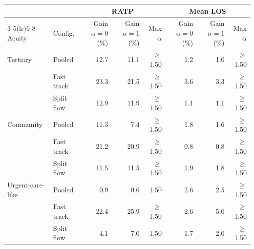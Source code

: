 \begin{tabular}{llrrrrrr}
\toprule
 & & \multicolumn{3}{c}{RATP} & \multicolumn{3}{c}{Mean LOS} \\
\cmidrule(lr){3-5}\cmidrule(lr){6-8}
Acuity & Config. & Gain $\alpha{=}0$ (\%) & Gain $\alpha{=}1$ (\%) & Max $\alpha$ & Gain $\alpha{=}0$ (\%) & Gain $\alpha{=}1$ (\%) & Max $\alpha$ \\
\midrule
Tertiary & Pooled & 12.7 & 11.1 & $\geq$1.50 & 1.2 & 1.0 & $\geq$1.50 \\
 & Fast track & 23.3 & 21.5 & $\geq$1.50 & 3.6 & 3.3 & $\geq$1.50 \\
 & Split flow & 12.9 & 11.9 & $\geq$1.50 & 1.1 & 1.1 & $\geq$1.50 \\
Community & Pooled & 11.3 & 7.4 & $\geq$1.50 & 1.8 & 1.6 & $\geq$1.50 \\
 & Fast track & 21.2 & 20.9 & $\geq$1.50 & 0.8 & 0.8 & $\geq$1.50 \\
 & Split flow & 11.5 & 11.5 & $\geq$1.50 & 1.9 & 1.8 & $\geq$1.50 \\
Urgent-care-like & Pooled & 0.9 & 0.6 & 1.50 & 2.6 & 2.5 & $\geq$1.50 \\
 & Fast track & 22.4 & 25.9 & $\geq$1.50 & 2.6 & 5.0 & $\geq$1.50 \\
 & Split flow & 4.1 & 7.0 & 1.50 & 1.7 & 2.0 & $\geq$1.50 \\
\bottomrule
\end{tabular}